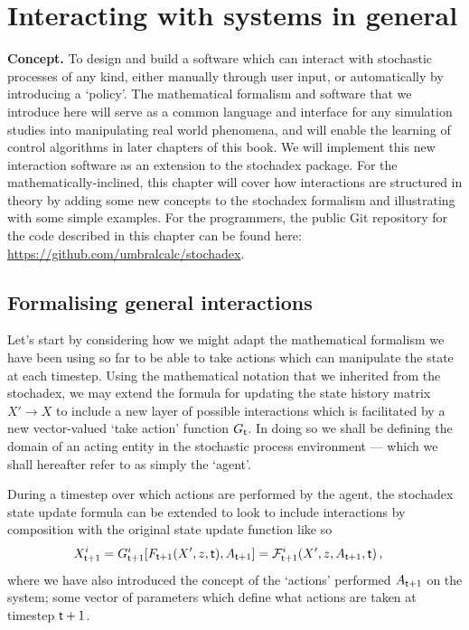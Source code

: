 \chapter{\sffamily Interacting with systems in general}

{\bfseries\sffamily Concept.} To design and build a software which can interact with stochastic processes of any kind, either manually through user input, or automatically by introducing a `policy'. The mathematical formalism and software that we introduce here will serve as a common language and interface for any simulation studies into manipulating real world phenomena, and will enable the learning of control algorithms in later chapters of this book. We will implement this new interaction software as an extension to the stochadex package. For the mathematically-inclined, this chapter will cover how interactions are structured in theory by adding some new concepts to the stochadex formalism and illustrating with some simple examples. For the programmers, the public Git repository for the code described in this chapter can be found here: \href{https://github.com/umbralcalc/stochadex}{https://github.com/umbralcalc/stochadex}.

\section{\sffamily Formalising general interactions}

Let's start by considering how we might adapt the mathematical formalism we have been using so far to be able to take actions which can manipulate the state at each timestep. Using the mathematical notation that we inherited from the stochadex, we may extend the formula for updating the state history matrix $X'\rightarrow X$ to include a new layer of possible interactions which is facilitated by a new vector-valued `take action' function $G_{{\sf t}}$. In doing so we shall be defining the domain of an acting entity in the stochastic process environment --- which we shall hereafter refer to as simply the `agent'.

During a timestep over which actions are performed by the agent, the stochadex state update formula can be extended to look to include interactions by composition with the original state update function like so
\begin{align}
X_{{\sf t}+1}^i &= G^i_{{\sf t}+1}[F_{{\sf t}+1}(X', z, {\sf t}), A_{{\sf t}+1}] = {\cal F}^i_{{\sf t}+1}(X', z, A_{{\sf t}+1}, {\sf t}) \label{eq:generalised-state-actions} \,,
\end{align}
where we have also introduced the concept of the `actions' performed $A_{{\sf t}+1}$ on the system; some vector of parameters which define what actions are taken at timestep ${\sf t}+1$.

